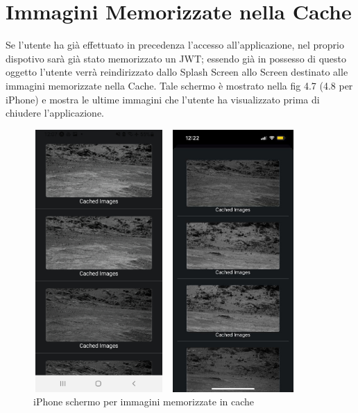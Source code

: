 \section*{Immagini Memorizzate nella Cache}
Se l'utente ha gi\`a effettuato in precedenza l'accesso all'applicazione, nel proprio dispotivo sar\`a gi\`a stato memorizzato un JWT;
essendo gi\`a in possesso di questo oggetto l'utente verr\`a reindirizzato dallo Splash Screen allo Screen destinato alle immagini memorizzate nella Cache. Tale schermo \`e mostrato
nella fig 4.7 (4.8 per iPhone) e mostra le ultime immagini che l'utente ha visualizzato prima di chiudere l'applicazione.
\begin{figure}[h]
    \begin{minipage}[h]{0.47\textwidth}
        \centering
        \includegraphics[width=5cm, height=10cm]{images/immaginiAndroid/imagesLoadin.jpg}
        \caption{\label{imagesLoadinAndroid} Android schermo per immagini memorizzate in cache}
    \end{minipage}
    \hfill
    \begin{minipage}[h]{0.47\textwidth}
        \centering
        \includegraphics[width=5cm, height=10cm]{images/immaginiPhone/imagesLoading.jpeg}
        \caption{\label{imagesLoadinIphone}iPhone schermo per immagini memorizzate in cache}
    \end{minipage}
\end{figure}

